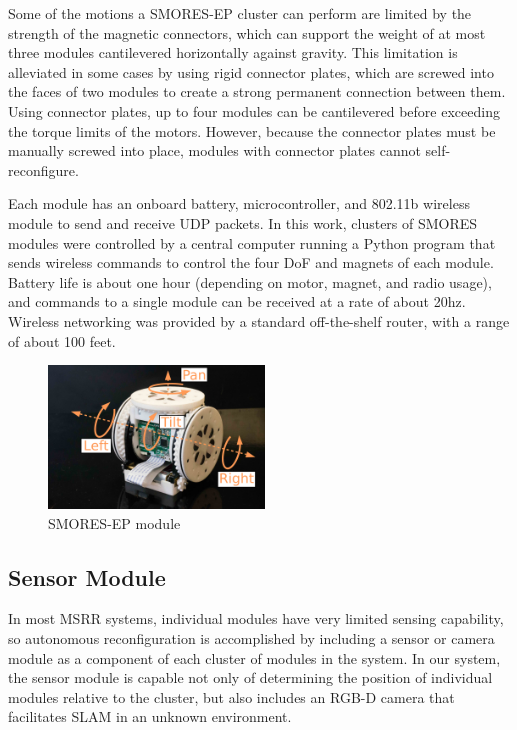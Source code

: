 \documentclass[conference]{IEEEtran}
\begin{document}
Some of the motions a SMORES-EP cluster can perform are limited by the
strength of the magnetic connectors, which can support the weight of at most
three modules cantilevered horizontally against gravity.  This limitation is
alleviated in some cases by using rigid connector plates, which are screwed
into the faces  of two modules to create a strong permanent connection between
them. Using connector  plates, up to four modules can be cantilevered before
exceeding the torque limits  of the motors.  However, because the connector
plates must be manually screwed into place,  modules with connector plates
cannot self-reconfigure.

Each module has an onboard battery, microcontroller, and 802.11b wireless
module to send and receive UDP packets.  In this work, clusters of SMORES
modules were controlled by a central computer running a Python program that
sends wireless commands to control the four DoF and magnets of each module.
Battery life is about one hour (depending on motor, magnet, and radio usage),
and commands to a single module can be received at a rate of about 20hz.
Wireless networking was provided by a standard off-the-shelf  router, with a
range of about 100 feet.

\begin{figure}[h]   
\begin{center}
\includegraphics[height=1.5in]{images/smores_dof.pdf}
\end{center}
\caption{SMORES-EP module}
\label{fig:smores-module}
\end{figure}
%

\subsection{Sensor Module} %
\label{sec:sensor_module}
%
In most MSRR systems, individual modules have very limited sensing capability, so autonomous reconfiguration is accomplished by including a sensor or camera module as a component of each cluster of modules in the system.  In our system, the sensor module is capable not only of determining the position of individual modules relative to the cluster, but also includes an RGB-D camera that facilitates SLAM in an unknown environment.
%
%
\end{document}
